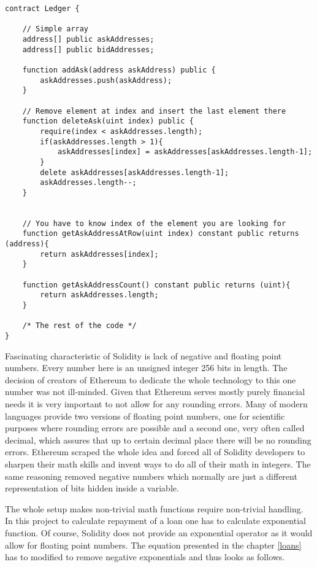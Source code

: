 \documentclass[a4paper,12pt,twoside,openany]{report}
\begin{document}
\begin{lstlisting}
contract Ledger {

 	// Simple array
	address[] public askAddresses;
	address[] public bidAddresses;

	function addAsk(address askAddress) public {
		askAddresses.push(askAddress);
	}

	// Remove element at index and insert the last element there
	function deleteAsk(uint index) public {
		require(index < askAddresses.length);
		if(askAddresses.length > 1){
			askAddresses[index] = askAddresses[askAddresses.length-1];
		}
		delete askAddresses[askAddresses.length-1];
		askAddresses.length--;
	}


	// You have to know index of the element you are looking for
	function getAskAddressAtRow(uint index) constant public returns (address){
		return askAddresses[index];
	}

	function getAskAddressCount() constant public returns (uint){
		return askAddresses.length;
	}

	/* The rest of the code */
}
\end{lstlisting}
 
Fascinating characteristic of Solidity is lack of negative and floating point numbers. Every number here is an unsigned integer 256 bits in length. The decision of creators of Ethereum to dedicate the whole technology to this one number was not ill-minded. Given that Ethereum serves mostly purely financial needs it is very important to not allow for any rounding errors. Many of modern languages provide two versions of floating point numbers, one for scientific purposes where rounding errors are possible and a second one, very often called decimal, which assures that up to certain decimal place there will be no rounding errors. Ethereum scraped the whole idea and forced all of Solidity developers to sharpen their math skills and invent ways to do all of their math in integers. The same reasoning removed negative numbers which normally are just a different representation of bits hidden inside a variable.

The whole setup makes non-trivial math functions require non-trivial handling. In this project to calculate repayment of a loan one has to calculate exponential function. Of course, Solidity does not provide an exponential operator as it would allow for floating point numbers. The equation presented in the chapter \ref{loans} has to modified to remove negative exponentials and thus looks as follows.
	
\end{document}
